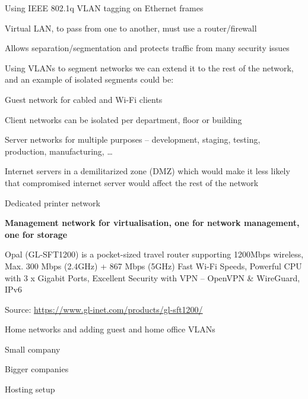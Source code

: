 \documentclass[Screen16to9,17pt]{foils}
\begin{document}


\begin{list1}
\item Using IEEE 802.1q  VLAN tagging on Ethernet frames
\item Virtual LAN, to pass from one to another, must use a router/firewall
\item Allows separation/segmentation and protects traffic from many security issues
\end{list1}



Using VLANs to segment networks we can extend it to the rest of the network, and an example of isolated segments could be:
\begin{list2}
\item Guest network for cabled and Wi-Fi clients
\item Client networks can be isolated per department, floor or building
\item Server networks for multiple purposes – development, staging, testing, production, manufacturing, …
\item Internet servers in a demilitarized zone (DMZ) which would make it less likely that compromised internet
server would affect the rest of the network
\item Dedicated printer network
\item \textbf{Management network for virtualisation, one for network management, one for storage}
\end{list2}




\begin{list2}
\item Opal (GL-SFT1200) is a pocket-sized travel router supporting 1200Mbps wireless,
Max. 300 Mbps (2.4GHz) + 867 Mbps (5GHz) Fast Wi-Fi Speeds, Powerful CPU with 3 x Gigabit Ports,
Excellent Security with VPN -- OpenVPN \& WireGuard, IPv6
\end{list2}
Source: \url{https://www.gl-inet.com/products/gl-sft1200/}



\begin{list2}
\item Home networks and adding guest and home office VLANs
\item Small company
\item Bigger companies
\item Hosting setup
\end{list2}
\end{document}
